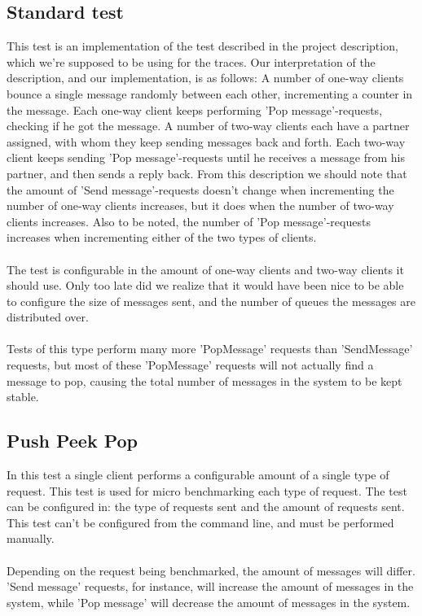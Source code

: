 \documentclass{article}
\begin{document}
        \subsection{Standard test}
            \label{sec:standard_test}
            This test is an implementation of the test described in the project description, which we're supposed to be using for the traces. Our interpretation of the description, and our implementation, is as follows: A number of one-way clients bounce a single message randomly between each other, incrementing a counter in the message. Each one-way client keeps performing 'Pop message'-requests, checking if he got the message. A number of two-way clients each have a partner assigned, with whom they keep sending messages back and forth. Each two-way client keeps sending 'Pop message'-requests until he receives a message from his partner, and then sends a reply back. From this description we should note that the amount of 'Send message'-requests doesn't change when incrementing the number of one-way clients increases, but it does when the number of two-way clients increases. Also to be noted, the number of 'Pop message'-requests increases when incrementing either of the two types of clients.\\
            \\
            The test is configurable in the amount of one-way clients and two-way clients it should use. Only too late did we realize that it would have been nice to be able to configure the size of messages sent, and the number of queues the messages are distributed over.\\
            \\
            Tests of this type perform many more 'PopMessage' requests than 'SendMessage' requests, but most of these 'PopMessage' requests will not actually find a message to pop, causing the total number of messages in the system to be kept stable.

        \subsection{Push Peek Pop}
            In this test a single client performs a configurable amount of a single type of request. This test is used for micro benchmarking each type of request.
            The test can be configured in: the type of requests sent and the amount of requests sent. This test can't be configured from the command line, and must be performed manually.\\
            \\
            Depending on the request being benchmarked, the amount of messages will differ. 'Send message' requests, for instance, will increase the amount of messages in the system, while 'Pop message' will decrease the amount of messages in the system.
\end{document}

